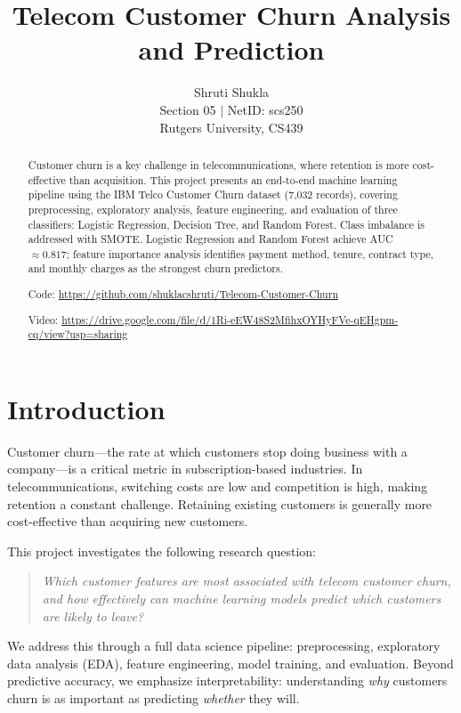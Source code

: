\documentclass{article}
\title{Telecom Customer Churn Analysis and Prediction}
\author{%
  Shruti Shukla \\
  Section 05 $\mid$ NetID: scs250 \\
  Rutgers University, CS439 \\
}
\begin{document}
\maketitle

\begin{abstract}
Customer churn is a key challenge in telecommunications, where retention is
more cost-effective than acquisition. This project presents an end-to-end
machine learning pipeline using the IBM Telco Customer Churn dataset (7,032
records), covering preprocessing, exploratory analysis, feature engineering,
and evaluation of three classifiers: Logistic Regression, Decision Tree, and
Random Forest. Class imbalance is addressed with SMOTE. Logistic Regression
and Random Forest achieve AUC $\approx 0.817$; feature importance analysis
identifies payment method, tenure, contract type, and monthly charges as the
strongest churn predictors.

\vspace{0.5em}

\noindent
Code: \url{https://github.com/shuklacshruti/Telecom-Customer-Churn}

\noindent
Video: \url{https://drive.google.com/file/d/1Ri-eEW48S2MfihxOYHyFVe-qEHgpm-cq/view?usp=sharing}

\end{abstract}


\section{Introduction}

Customer churn---the rate at which customers stop doing business with a
company---is a critical metric in subscription-based industries. In
telecommunications, switching costs are low and competition is high, making
retention a constant challenge. Retaining existing customers is generally more cost-effective than acquiring new customers. 

This project investigates the following research question:

\begin{quote}
\textit{Which customer features are most associated with telecom customer
churn, and how effectively can machine learning models predict which customers
are likely to leave?}
\end{quote}

We address this through a full data science pipeline: preprocessing,
exploratory data analysis (EDA), feature engineering, model training, and
evaluation. Beyond predictive accuracy, we emphasize interpretability:
understanding \emph{why} customers churn is as important as predicting
\emph{whether} they will.
\end{document}

